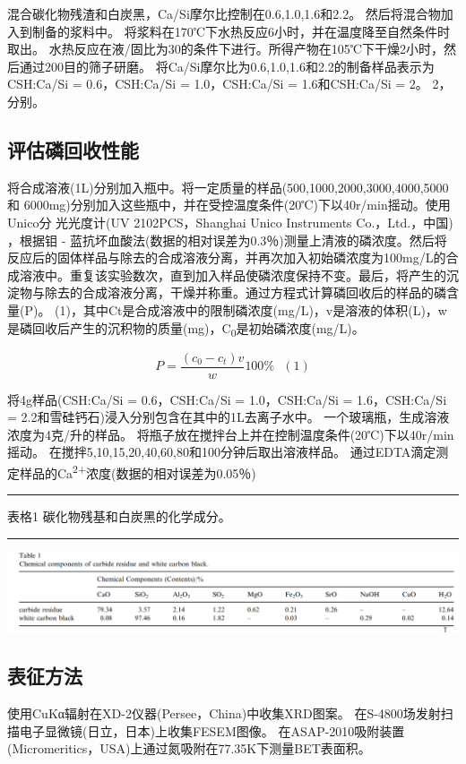 \documentclass[11pt]{article}
\begin{document}
混合碳化物残渣和白炭黑，Ca/Si摩尔比控制在0.6,1.0,1.6和2.2。 然后将混合物加入到制备的浆料中。 将浆料在170℃下水热反应6小时，并在温度降至自然条件时取出。 水热反应在液/固比为30的条件下进行。所得产物在105℃下干燥2小时，然后通过200目的筛子研磨。 将Ca/Si摩尔比为0.6,1.0,1.6和2.2的制备样品表示为CSH:Ca/Si = 0.6，CSH:Ca/Si = 1.0，CSH:Ca/Si = 1.6和CSH:Ca/Si = 2。 2，分别。
\subsection{评估磷回收性能}
\label{sec:org91a4fbd}
将合成溶液(1L)分别加入瓶中。将一定质量的样品(500,1000,2000,3000,4000,5000和
6000mg)分别加入这些瓶中，并在受控温度条件(20℃)下以40r/min摇动。使用Unico分
光光度计(UV 2102PCS，Shanghai Unico Instruments Co.，Ltd.，中国)
\cite{gustafsson08_phosp_remov_by_miner_based} ，根据钼 - 蓝抗坏血酸法(数据的相对误差为0.3％)测量上清液的磷浓度。然后将反应后的固体样品与除去的合成溶液分离，并再次加入初始磷浓度为100mg/L的合成溶液中。重复该实验数次，直到加入样品使磷浓度保持不变。最后，将产生的沉淀物与除去的合成溶液分离，干燥并称重。通过方程式计算磷回收后的样品的磷含量(P)。 (1)，其中Ct是合成溶液中的限制磷浓度(mg/L)，v是溶液的体积(L)，w是磷回收后产生的沉积物的质量(mg)，C\textsubscript{0}是初始磷浓度(mg/L)。

\[P = \frac{(c_{0} - c_{t})v}{w} 100\% \ \ \  (1)\]

将4g样品(CSH:Ca/Si = 0.6，CSH:Ca/Si = 1.0，CSH:Ca/Si = 1.6，CSH:Ca/Si = 2.2和雪硅钙石)浸入分别包含在其中的1L去离子水中。 一个玻璃瓶，生成溶液浓度为4克/升的样品。 将瓶子放在搅拌台上并在控制温度条件(20℃)下以40r/min摇动。 在搅拌5,10,15,20,40,60,80和100分钟后取出溶液样品。 通过EDTA滴定测定样品的Ca\textsuperscript{2+}浓度(数据的相对误差为0.05％)\cite{kim03_effec_ph_sulfat_sodium_edta_titrat_calcium}

\noindent\rule{\textwidth}{0.5pt}
表格1
碳化物残基和白炭黑的化学成分。

\noindent\rule{\textwidth}{0.5pt}

\includegraphics[scale=0.3]{table1.png}

\subsection{表征方法}
\label{sec:org6fbd68a}
使用CuKα辐射在XD-2仪器(Persee，China)中收集XRD图案。 在S-4800场发射扫描电子显微镜(日立，日本)上收集FESEM图像。 在ASAP-2010吸附装置(Micromeritics，USA)上通过氮吸附在77.35K下测量BET表面积。
\end{document}
